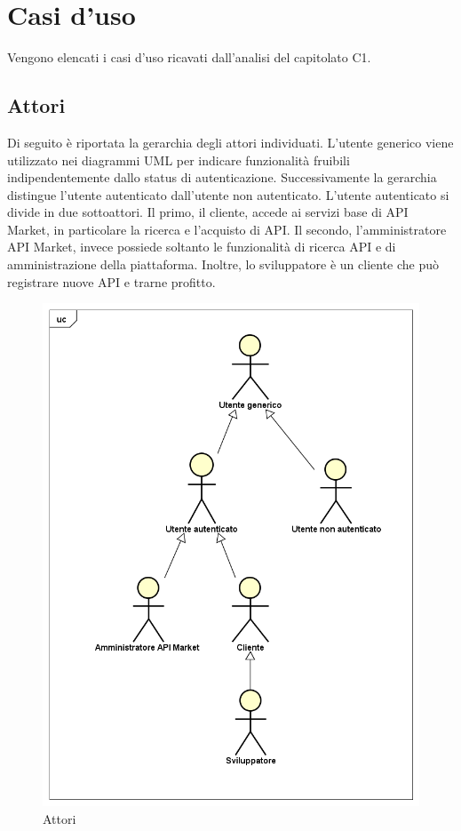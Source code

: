 \newpage
\section{Casi d'uso}
Vengono elencati i casi d'uso ricavati dall'analisi del capitolato C1.

\subsection{Attori}
Di seguito è riportata la gerarchia degli attori individuati. L'utente generico viene utilizzato nei diagrammi UML per indicare funzionalità fruibili indipendentemente dallo status di autenticazione. Successivamente la gerarchia distingue l'utente autenticato dall'utente non autenticato. L'utente autenticato si divide in due sottoattori. Il primo, il cliente, accede ai servizi base di API Market, in particolare la ricerca e l'acquisto di API. Il secondo, l'amministratore API Market, invece possiede soltanto le funzionalità di ricerca API e di amministrazione della piattaforma. Inoltre, lo sviluppatore è un cliente che può registrare nuove API e trarne profitto.

\label{Attori}

\begin{figure}[ht]
	\centering
	\includegraphics[scale=0.45]{UML/Attori.png}
	\caption{Attori}
\end{figure}


